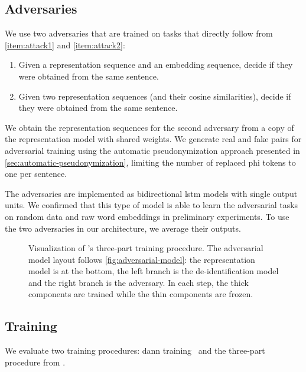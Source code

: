 \subsection{Adversaries}
%
We use two adversaries that are trained on tasks that directly follow from \ref{item:attack1} and \ref{item:attack2}:
\begin{enumerate}[label=T\arabic*.,ref=T\arabic*]
    \item Given a representation sequence and an embedding sequence, decide if they were obtained from the same sentence.
    \item Given two representation sequences (and their cosine similarities), decide if they were obtained from the same sentence.
\end{enumerate}
%
We obtain the representation sequences for the second adversary from a copy of the representation model with shared weights.
%
We generate real and fake pairs for adversarial training using the automatic pseudonymization approach presented in \cref{sec:automatic-pseudonymization}, limiting the number of replaced \ac{phi} tokens to one per sentence.

%
The adversaries are implemented as bidirectional \ac{lstm} models with single output units.
%
We confirmed that this type of model is able to learn the adversarial tasks on random data and raw word embeddings in preliminary experiments.
%
To use the two adversaries in our architecture, we average their outputs.


 \begin{figure}
    \centering
    
    \caption[Adversarial training procedure]{%
        Visualization of \citeauthor{feutry2018learning}'s three-part training procedure.
        The adversarial model layout follows \cref{fig:adversarial-model}: the representation model is at the bottom, the left branch is the de-identification model and the right branch is the adversary.
        In each step, the thick components are trained while the thin components are frozen.
    }\label{fig:feutry-training}
\end{figure}

\subsection{Training}
%
We evaluate two training procedures: \ac{dann} training~\citep{ganin2016domain} and the three-part procedure from \citet{feutry2018learning}.

